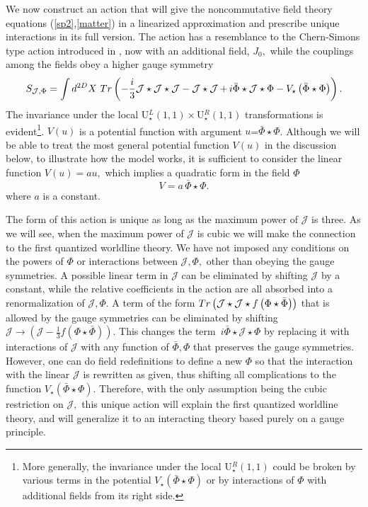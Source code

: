 \documentclass[a4paper,12pt]{article}
\begin{document}
We now construct an action that will give the noncommutative field theory
equations (\ref{sp2},\ref{matter}) in a linearized approximation and
prescribe unique interactions in its full version. The action has a
resemblance to the Chern-Simons type action introduced in \cite{NCSp}, now
with an additional field, $J_{0},$ while the couplings among the fields obey
a higher gauge symmetry 
\begin{equation}
S_{\mathcal{J},\Phi }=\int d^{2D}X\,\,Tr\left( -\frac{i}{3}\mathcal{J}\star 
\mathcal{J}\star \mathcal{J}-\mathcal{J}\star \mathcal{J}\,\mathbf{+\,}i\bar{%
\Phi}\star \mathcal{J}\star \Phi -V_{\star }\left( \bar{\Phi}\star \Phi
\right) \right) .  \label{SZ}
\end{equation}
The invariance under the local U$_{\star }^{L}\left( 1,1\right) \times $U$%
_{\star }^{R}\left( 1,1\right) $ transformations is evident\footnote{%
More generally, the invariance under the local U$_{\star }^{R}\left(
1,1\right) $ could be broken by various terms in the potential $V_{\star
}\left( \bar{\Phi}\star \Phi \right) $ or by interactions of $\Phi $ with
additional fields from its right side.}. $V\left( u\right) $ is a potential
function with argument $u$=$\bar{\Phi}\star \Phi $. Although we will be able
to treat the most general potential function $V\left( u\right) $ in the
discussion below, to illustrate how the model works, it is sufficient to
consider the linear function $V\left( u\right) =au,$ which implies a
quadratic form in the field $\Phi $ 
\begin{equation}
V=a\,\bar{\Phi}\star \Phi .  \label{V}
\end{equation}
where $a$ is a constant.

The form of this action is unique as long as the maximum power of $\mathcal{J%
}$ is three. As we will see, when the maximum power of $\mathcal{J}$ is
cubic we will make the connection to the first quantized worldline theory.
We have not imposed any conditions on the powers of $\Phi $ or interactions
between $\mathcal{J},\Phi ,$ other than obeying the gauge symmetries. A
possible linear term in $\mathcal{J}$ can be eliminated by shifting $%
\mathcal{J}$ by a constant, while the relative coefficients in the action
are all absorbed into a renormalization of $\mathcal{J},\Phi $. A term of
the form $Tr\left( \mathcal{J}\star \mathcal{J}\star f\left( \Phi \star \bar{%
\Phi}\right) \right) $ that is allowed by the gauge symmetries can be
eliminated by shifting $\mathcal{J}\rightarrow \left( \mathcal{J}-\frac{1}{3}%
f\left( \Phi \star \bar{\Phi}\right) \right) .$ This changes the term $%
\mathbf{\,}i\bar{\Phi}\star \mathcal{J}\star \Phi $ by replacing it with
interactions of $\mathcal{J}$ with any function of $\bar{\Phi},\Phi $ that
preserves the gauge symmetries$.$ However, one can do field redefinitions to
define a new $\Phi $ so that the interaction with the linear $\mathcal{J}$
is rewritten as given, thus shifting all complications to the function $%
V_{\star }\left( \bar{\Phi}\star \Phi \right) $. Therefore, with the only
assumption being the cubic restriction on $\mathcal{J},$ this unique action
will explain the first quantized worldline theory, and will generalize it to
an interacting theory based purely on a gauge principle.
\end{document}
